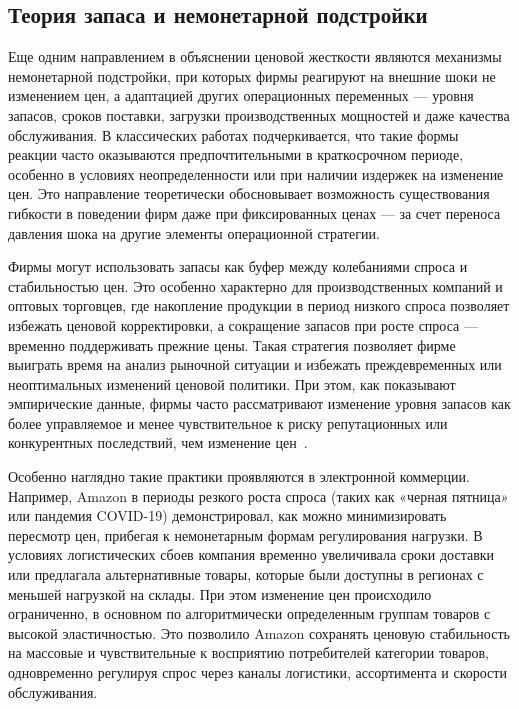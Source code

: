 \subsection{Теория запаса и немонетарной подстройки}\label{subsec:ch1/sec2/inventory}

Еще одним направлением в объяснении ценовой жесткости являются механизмы немонетарной подстройки, при которых фирмы реагируют на внешние шоки не изменением цен, а адаптацией других операционных переменных — уровня запасов, сроков поставки, загрузки производственных мощностей и даже качества обслуживания. В классических работах \cite{Blinder1981, Carlton1989} подчеркивается, что такие формы реакции часто оказываются предпочтительными в краткосрочном периоде, особенно в условиях неопределенности или при наличии издержек на изменение цен. Это направление теоретически обосновывает возможность существования гибкости в поведении фирм даже при фиксированных ценах — за счет переноса давления шока на другие элементы операционной стратегии.

Фирмы могут использовать запасы как буфер между колебаниями спроса и стабильностью цен. Это особенно характерно для производственных компаний и оптовых торговцев, где накопление продукции в период низкого спроса позволяет избежать ценовой корректировки, а сокращение запасов при росте спроса — временно поддерживать прежние цены. Такая стратегия позволяет фирме выиграть время на анализ рыночной ситуации и избежать преждевременных или неоптимальных изменений ценовой политики. При этом, как показывают эмпирические данные, фирмы часто рассматривают изменение уровня запасов как более управляемое и менее чувствительное к риску репутационных или конкурентных последствий, чем изменение цен~\cite{BilsKlenow2004}.

Особенно наглядно такие практики проявляются в электронной коммерции. Например, Amazon в периоды резкого роста спроса (таких как «черная пятница» или пандемия COVID-19) демонстрировал, как можно минимизировать пересмотр цен, прибегая к немонетарным формам регулирования нагрузки. В условиях логистических сбоев компания временно увеличивала сроки доставки или предлагала альтернативные товары, которые были доступны в регионах с меньшей нагрузкой на склады. При этом изменение цен происходило ограниченно, в основном по алгоритмически определенным группам товаров с высокой эластичностью. Это позволило Amazon сохранять ценовую стабильность на массовые и чувствительные к восприятию потребителей категории товаров, одновременно регулируя спрос через каналы логистики, ассортимента и скорости обслуживания.


